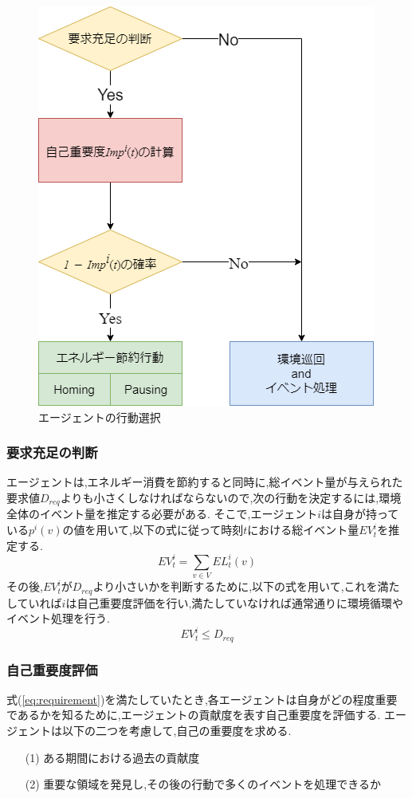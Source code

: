 \documentclass[12pt,a4j,twoside]{jarticle}
\begin{document}
  \begin{figure}
    \centering
    \includegraphics[width=0.6\hsize]{figures/Flowchart.png}
    \caption{エージェントの行動選択}
    \label{fig:flowchart}
  \end{figure}

  \subsubsection{要求充足の判断}
  エージェントは,エネルギー消費を節約すると同時に,総イベント量が与えられた要求値$D_{req}$よりも小さくしなければならないので,次の行動を決定するには,環境全体のイベント量を推定する必要がある.
  そこで,エージェント$i$は自身が持っている$p^i(v)$の値を用いて,以下の式に従って時刻$t$における総イベント量$EV^i_t$を推定する.
  \begin{equation}
    EV^i_t = \sum_{v \in V} EL^i_t(v)
  \end{equation}
  その後,$EV^i_t$が$D_{req}$より小さいかを判断するために,以下の式を用いて,これを満たしていれば$i$は自己重要度評価を行い,満たしていなければ通常通りに環境循環やイベント処理を行う.
  \begin{equation}
    \label{eq:requirement}
    EV^i_t \leq D_{req}
  \end{equation}

  \subsubsection{自己重要度評価}
  式(\ref{eq:requirement})を満たしていたとき,各エージェントは自身がどの程度重要であるかを知るために,エージェントの貢献度を表す自己重要度を評価する.
  エージェントは以下の二つを考慮して,自己の重要度を求める.
  \begin{enumerate}
    \item[(1)] ある期間における過去の貢献度
    \item[(2)] 重要な領域を発見し,その後の行動で多くのイベントを処理できるか
  \end{enumerate}
\end{document}
